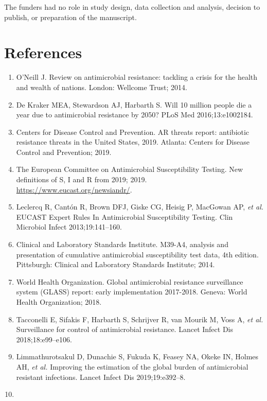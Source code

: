 \documentclass[
]{book}
\providecommand{\tightlist}{%
  \setlength{\itemsep}{0pt}\setlength{\parskip}{0pt}}
\begin{document}
The funders had no role in study design, data collection and analysis, decision to publish, or preparation of the manuscript.

\hypertarget{references-3}{%
\section*{References}\label{references-3}}

\begin{enumerate}
\def\labelenumi{\arabic{enumi}.}
\tightlist
\item
  O'Neill J. Review on antimicrobial resistance: tackling a crisis for the health and wealth of nations. London: Wellcome Trust; 2014.
\item
  De Kraker MEA, Stewardson AJ, Harbarth S. Will 10 million people die a year due to antimicrobial resistance by 2050? PLoS Med 2016;13:e1002184.
\item
  Centers for Disease Control and Prevention. AR threats report: antibiotic resistance threats in the United States, 2019. Atlanta: Centers for Disease Control and Prevention; 2019.
\item
  The European Committee on Antimicrobial Susceptibility Testing. New definitions of S, I and R from 2019; 2019. \url{https://www.eucast.org/newsiandr/}.
\item
  Leclercq R, Cantón R, Brown DFJ, Giske CG, Heisig P, MacGowan AP, \emph{et al.} EUCAST Expert Rules In Antimicrobial Susceptibility Testing. Clin Microbiol Infect 2013;19:141--160.
\item
  Clinical and Laboratory Standards Institute. M39-A4, analysis and presentation of cumulative antimicrobial susceptibility test data, 4th edition. Pittsburgh: Clinical and Laboratory Standards Institute; 2014.
\item
  World Health Organization. Global antimicrobial resistance surveillance system (GLASS) report: early implementation 2017-2018. Geneva: World Health Organization; 2018.
\item
  Tacconelli E, Sifakis F, Harbarth S, Schrijver R, van Mourik M, Voss A, \emph{et al.} Surveillance for control of antimicrobial resistance. Lancet Infect Dis 2018;18:e99--e106.
\item
  Limmathurotsakul D, Dunachie S, Fukuda K, Feasey NA, Okeke IN, Holmes AH, \emph{et al.} Improving the estimation of the global burden of antimicrobial resistant infections. Lancet Infect Dis 2019;19:e392--8.
\item

\end{enumerate}
\end{document}
